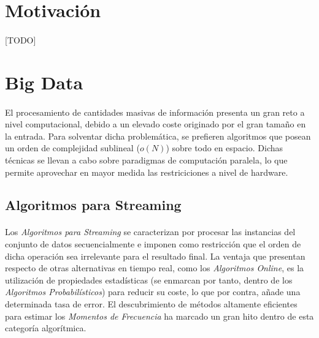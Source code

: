 \documentclass{subfiles}
\begin{document}
    \section{Motivación}
    \label{sec:introduction_motivation}

      \paragraph{}
      [TODO]

    \section{Big Data}
    \label{sec:introduction_big_data}

      \paragraph{}
      El procesamiento de cantidades masivas de información presenta un gran reto a nivel computacional, debido a un elevado coste originado por el gran tamaño en la entrada. Para solventar dicha problemática, se prefieren algoritmos que posean un orden de complejidad sublineal ($o(N)$) sobre todo en espacio. Dichas técnicas se llevan a cabo sobre paradigmas de computación paralela, lo que permite aprovechar en mayor medida las restriciciones a nivel de hardware.

      \subsection{Algoritmos para Streaming}

        \paragraph{}
        Los \emph{Algoritmos para Streaming} se caracterizan por procesar las instancias del conjunto de datos secuencialmente e imponen como restricción que el orden de dicha operación sea irrelevante para el resultado final. La ventaja que presentan respecto de otras alternativas en tiempo real, como los \emph{Algoritmos Online}, es la utilización de propiedades estadísticas (se enmarcan por tanto, dentro de los \emph{Algoritmos Probabilísticos}) para reducir su coste, lo que por contra, añade una determinada tasa de error. El descubrimiento de métodos altamente eficientes para estimar los \emph{Momentos de Frecuencia} ha marcado un gran hito dentro de esta categoría algorítmica.
\end{document}
